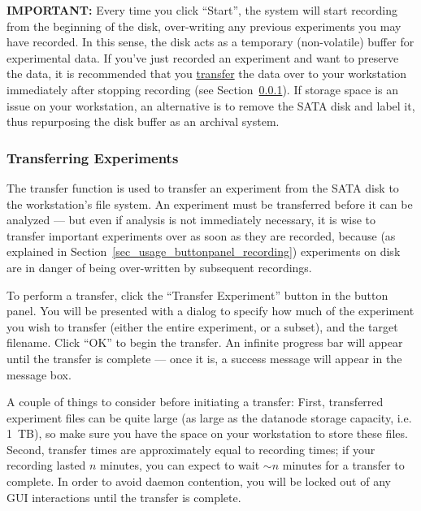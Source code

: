 \vspace{5mm}
\noindent \textbf{IMPORTANT:} Every time you click ``Start'', the system will start recording from the beginning of the disk, over-writing any previous experiments you may have recorded. In this sense, the disk acts as a temporary (non-volatile) buffer for experimental data. If you've just recorded an experiment and want to preserve the data, it is recommended that you \underline{transfer} the data over to your workstation immediately after stopping recording (see Section~\ref{sec_usage_buttonpanel_transfer}). If storage space is an issue on your workstation, an alternative is to remove the SATA disk and label it, thus repurposing the disk buffer as an archival system.

\subsubsection{Transferring Experiments}
\label{sec_usage_buttonpanel_transfer}

The transfer function is used to transfer an experiment from the SATA disk to the workstation's file system. An experiment must be transferred before it can be analyzed --- but even if analysis is not immediately necessary, it is wise to transfer important experiments over as soon as they are recorded, because (as explained in Section~\ref{sec_usage_buttonpanel_recording}) experiments on disk are in danger of being over-written by subsequent recordings.

To perform a transfer, click the ``Transfer Experiment'' button in the button panel. You will be presented with a dialog to specify how much of the experiment you wish to transfer (either the entire experiment, or a subset), and the target filename. Click ``OK'' to begin the transfer. An infinite progress bar will appear until the transfer is complete --- once it is, a success message will appear in the message box.

A couple of things to consider before initiating a transfer: First, transferred experiment files can be quite large (as large as the datanode storage capacity, i.e. 1~TB), so make sure you have the space on your workstation to store these files. Second, transfer times are approximately equal to recording times; if your recording lasted $n$ minutes, you can expect to wait $\sim n$ minutes for a transfer to complete. In order to avoid daemon contention, you will be locked out of any GUI interactions until the transfer is complete.

